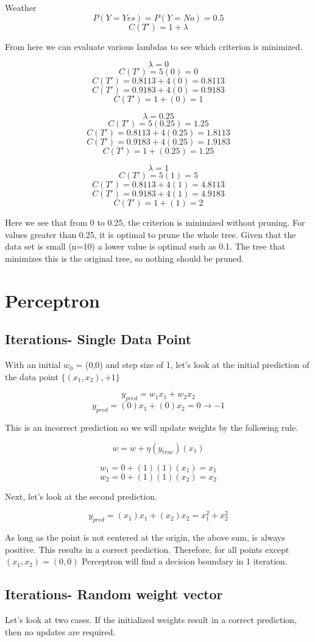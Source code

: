 \documentclass{article}
\begin{document}
Weather
\[P(Y = Yes) = P(Y = No) = 0.5\]
\[C(T') =  1 + \lambda\]

From here we can evaluate various lambdas to see which criterion is minimized. 

\[\lambda = 0 \]
\[C(T') =  5(0) = 0\]
\[C(T') = 0.8113 + 4(0) = 0.8113 \]
\[C(T') = 0.9183 + 4(0) = 0.9183\]
\[C(T') =  1 + (0) = 1\]

\[\lambda = 0.25 \]
\[C(T') =  5(0.25) = 1.25\]
\[C(T') = 0.8113 + 4(0.25) = 1.8113 \]
\[C(T') = 0.9183 + 4(0.25) = 1.9183\]
\[C(T') =  1 + (0.25) = 1.25\]

\[\lambda = 1 \]
\[C(T') =  5(1) = 5\]
\[C(T') = 0.8113 + 4(1) = 4.8113 \]
\[C(T') = 0.9183 + 4(1) = 4.9183\]
\[C(T') =  1 + (1) = 2\]

Here we see that from 0 to 0.25, the criterion is minimized without pruning. For values greater than 0.25, it is optimal to prune the whole tree. Given that the data set is small (n=10) a lower value is optimal such as 0.1. The tree that minimizes this is the original tree, so nothing should be pruned.


\section{Perceptron}
\subsection{Iterations- Single Data Point}
With an initial $w_0$ = (0,0) and step size of 1, let's look at the initial prediction of the data point $\{(x_1, x_2), +1\}$

\[y_{pred} = w_1x_1 + w_2x_2\]
\[y_{pred} = (0)x_1 + (0)x_2 = 0 \rightarrow -1\] 

This is an incorrect prediction so we will update weights by the following rule.

\[w = w + \eta(y_{true})(x_1)\]

\[w_1 = 0 + (1)(1)(x_1) = x_1\]
\[w_2 = 0 + (1)(1)(x_2) = x_2\]

Next, let's look at the second prediction.

\[y_{pred} = (x_1)x_1 + (x_2)x_2 = x_1^2 + x_2^2\]

As long as the point is not centered at the origin, the above sum, is always positive. This results in a correct prediction. Therefore, for all points except $(x_1, x_2) = (0,0)$ Perceptron will find a decision boundary in 1 iteration.

\subsection{Iterations- Random weight vector}
Let's look at two cases. If the initialized weights result in a correct prediction, then no updates are required. 
\end{document}
